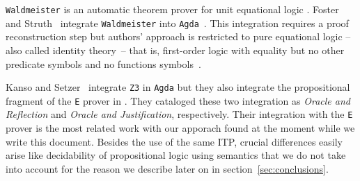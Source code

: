 \documentclass[main.tex]{subfiles}
\begin{document}


\verb!Waldmeister! is an automatic theorem prover for unit equational
logic \cite{hillenbrand1997}.
Foster and Struth~\cite{foster2011integrating} integrate \verb!Waldmeister! into
\verb!Agda!~\cite{agdateam}. This integration requires a proof
reconstruction step but authors' approach is restricted to pure
equational logic --also called identity theory~\cite{humberstone2011}--
that is, first-order logic with equality but no other predicate symbols
and no functions symbols~\cite{appel1959}.

Kanso and Setzer~\cite{kanso2016light} integrate \verb!Z3! in \verb!Agda!
but they also integrate the propositional fragment of the \verb!E! prover in
\cite{Kanso2012}. They cataloged these two integration as
\emph{Oracle and Reflection} and \emph{Oracle and Justification}, respectively.
Their integration with the \verb!E! prover is the most related work with our
apporach found at the moment while we write this document. Besides the use
of the same ITP, crucial differences easily arise like decidability of
propositional logic using semantics that we do not take into account for the
reason we describe later on in section~\ref{sec:conclusions}.
\end{document}
